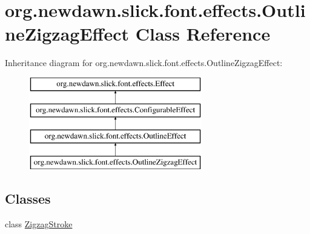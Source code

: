 \hypertarget{classorg_1_1newdawn_1_1slick_1_1font_1_1effects_1_1_outline_zigzag_effect}{}\section{org.\+newdawn.\+slick.\+font.\+effects.\+Outline\+Zigzag\+Effect Class Reference}
\label{classorg_1_1newdawn_1_1slick_1_1font_1_1effects_1_1_outline_zigzag_effect}
Inheritance diagram for org.\+newdawn.\+slick.\+font.\+effects.\+Outline\+Zigzag\+Effect\+:\begin{figure}[H]
\begin{center}
\leavevmode
\includegraphics[height=4.000000cm]{classorg_1_1newdawn_1_1slick_1_1font_1_1effects_1_1_outline_zigzag_effect}
\end{center}
\end{figure}
\subsection*{Classes}
\begin{DoxyCompactItemize}
\item 
class \mbox{\hyperlink{classorg_1_1newdawn_1_1slick_1_1font_1_1effects_1_1_outline_zigzag_effect_1_1_zigzag_stroke}{Zigzag\+Stroke}}
\end{DoxyCompactItemize}
